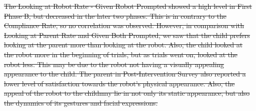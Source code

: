\documentclass{ut-thesis}
\providecommand{\DIFdeltex}[1]{{\protect\color{red}\sout{#1}}}                      %
\providecommand{\DIFdel}[1]{\texorpdfstring{\DIFdeltex{#1}}{}} %
\begin{document}
\DIFdel{The Looking at Robot Rate - Given Robot Prompted showed a high level in First Phase B, but decreased in the later two phases.  This is in contrary to the Compliance Rate, so no correlation was observed.  However, in comparison with Looking at Parent Rate and Given Both Prompted, we saw that the child prefers looking at the parent more than looking at the robot.  Also, the child looked at the robot more in the beginning of trials, but as trials went on, looked at the robot less.  This may be due to the robot not having a visually appealing appearance to the child.  The parent in Post-Intervention Survey also reported a lower level of satisfaction towards the robot's physical appearance.  Also, the appeal of the robot to the childmay lie in not only its static appearance, but also the dynamics of its gestures and facial expressions.  }%

\end{document}
